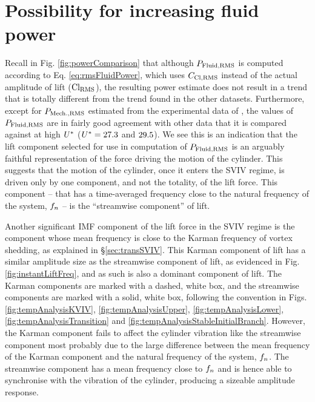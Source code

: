 \documentclass[oneside]{utmthesis}
\begin{document}
\section{Possibility for increasing fluid power} \label{sec:possIncrease}
Recall in Fig. \ref{fig:powerComparison} that although $P_{\text{Fluid,RMS}}$ is computed according to Eq. \ref{eq:rmsFluidPower}, which uses $C_{\text{Cl},\text{RMS}}$ instead of the actual \rms{} amplitude of lift ($\text{Cl}_{\text{RMS}}$), the resulting power estimate does not result in a trend that is totally different from the trend found in the other datasets. Furthermore, except for $P_{\text{Mech.,RMS}}$ estimated from the experimental data of \citet{Nguyen2012}, the values of $P_{\text{Fluid,RMS}}$ are in fairly good agreement with other data that it is compared against at high $U^{*}$ ($U^{*} = 27.3$ and $29.5$). We see this is an indication that the lift component selected for use in computation of $P_{\text{Fluid,RMS}}$ is an arguably faithful representation of the force driving the motion of the cylinder. This suggests that the motion of the cylinder, once it enters the SVIV regime, is driven only by one component, and not the totality, of the lift force. This component -- that has a time-averaged frequency close to the natural frequency of the system, $f_{n}$ -- is the ``streamwise component'' of lift.

Another significant IMF component of the lift force in the SVIV regime is the component whose mean frequency is close to the Karman frequency of vortex shedding, as explained in \S\ref{sec:transSVIV}. This Karman component of lift has a similar amplitude size as the streamwise component of lift, as evidenced in Fig. \ref{fig:instantLiftFreq}, and as such is also a dominant component of lift. The Karman components are marked with a dashed, white box, and the streamwise components are marked with a solid, white box, following the convention in Figs. \ref{fig:tempAnalysisKVIV}, \ref{fig:tempAnalysisUpper}, \ref{fig:tempAnalysisLower}, \ref{fig:tempAnalysisTransition} and \ref{fig:tempAnalysisStableInitialBranch}. However, the Karman component fails to affect the cylinder vibration like the streamwise component most probably due to the large difference between the mean frequency of the Karman component and the natural frequency of the system, $f_{n}$.  The streamwise component has a mean frequency close to $f_{n}$ and is hence able to synchronise with the vibration of the cylinder, producing a sizeable amplitude response.
\end{document}
